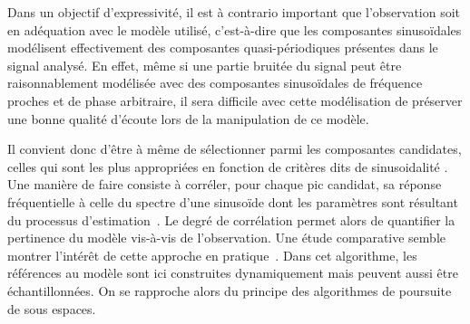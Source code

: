 


Dans un objectif d'expressivité, il est à contrario important que l'observation  soit en adéquation avec le modèle utilisé, c'est-à-dire que les composantes sinusoïdales modélisent effectivement des composantes quasi-périodiques présentes dans le signal analysé. En effet, même si une partie bruitée du signal peut être raisonnablement modélisée avec des composantes sinusoïdales de fréquence proches et de phase arbitraire, il sera difficile avec cette modélisation de préserver une bonne qualité d'écoute lors de la manipulation de ce modèle.

Il convient donc d'être à même de sélectionner parmi les composantes candidates, celles qui sont les plus appropriées en fonction de critères dits de \og sinusoidalité \fg. Une manière de faire consiste à corréler, pour chaque pic candidat, sa réponse fréquentielle à celle du spectre d'une sinusoïde dont les paramètres sont résultant du processus d'estimation~\cite{peak-selection}. Le degré de corrélation permet alors de quantifier la pertinence du modèle vis-à-vis de l'observation. Une étude comparative semble montrer l'intérêt de cette approche en pratique~\cite{wells2010comparative}. Dans cet algorithme, les références au modèle sont ici construites dynamiquement mais peuvent aussi être échantillonnées. On se rapproche alors du principe des algorithmes de poursuite de sous espaces.

